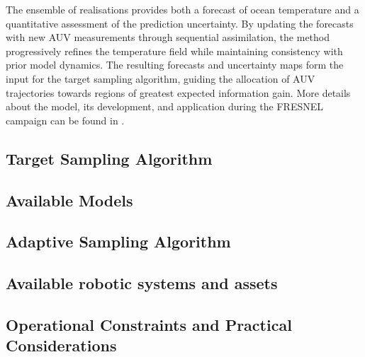 The ensemble of realisations provides both a forecast of ocean temperature and a quantitative assessment of the prediction uncertainty. By updating the forecasts with new AUV measurements through sequential assimilation, the method progressively refines the temperature field while maintaining consistency with prior model dynamics. The resulting forecasts and uncertainty maps form the input for the target sampling algorithm, guiding the allocation of AUV trajectories towards regions of greatest expected information gain. More details about the model, its development, and application during the FRESNEL campaign can be found in \cite{Duarte2025}.

\subsection{Target Sampling Algorithm}


\subsection{Available Models}
\subsection{Adaptive Sampling Algorithm}
\subsection{Available robotic systems and assets}


\subsection{Operational Constraints and Practical Considerations}


